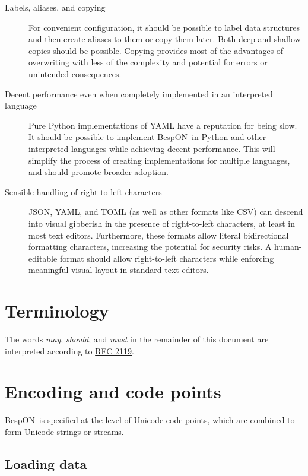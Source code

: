 \documentclass[11pt]{article}
\newcommand{\bespon}{BespON}
\begin{document}
\begin{description}
\item[Labels, aliases, and copying]  For convenient configuration, it should be possible to label data structures and then create aliases to them or copy them later.  Both deep and shallow copies should be possible.  Copying provides most of the advantages of overwriting with less of the complexity and potential for errors or unintended consequences.

\item[Decent performance even when completely implemented in an interpreted language]  Pure Python implementations of YAML have a reputation for being slow.  It should be possible to implement \bespon\ in Python and other interpreted languages while achieving decent performance.  This will simplify the process of creating implementations for multiple languages, and should promote broader adoption.

\item[Sensible handling of right-to-left characters]  JSON, YAML, and TOML (as well as other formats like CSV) can descend into visual gibberish in the presence of right-to-left characters, at least in most text editors.  Furthermore, these formats allow literal bidirectional formatting characters, increasing the potential for security risks.  A human-editable format should allow right-to-left characters while enforcing meaningful visual layout in standard text editors.
\end{description}




\section{Terminology}

The words \textit{may}, \textit{should}, and \textit{must} in the remainder of this document are interpreted according to \href{http://www.ietf.org/rfc/rfc2119.txt}{RFC 2119}.




\section{Encoding and code points}

\bespon\ is specified at the level of Unicode code points, which are combined to form Unicode strings or streams.


\subsection{Loading data}
\end{document}
